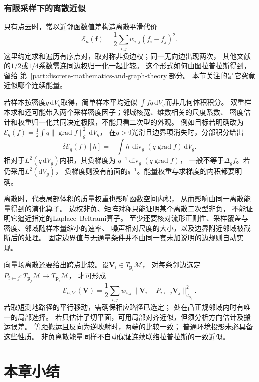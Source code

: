 \subsubsection{有限采样下的离散近似}
\label{sec:geometry-sampled-geometric-operators}

只有点云时，常以近邻函数值差构造离散平滑代价
\[
 \mathcal E_n(\bm f)=\frac12\sum_{i,j}w_{i,j}(f_i-f_j)^2.
\]
这里约定求和遍历有序点对，取对称非负边权；同一无向边出现两次，
其他文献的$1/2$或$1/4$系数需连同边权归一化一起比较。
这个形式如何由图拉普拉斯得到，留给
第~\ref{part:discrete-mathematics-and-graph-theory}部分。
本节关注的是它究竟近似哪个连续能量。

若样本按密度$q\,\mathrm dV_g$取得，简单样本平均近似
$\int f q\,\mathrm dV_g$而非几何体积积分。
双重样本求和还可能带入两个采样密度因子；邻域核宽、维数相关的尺度系数、
密度估计和权重归一化共同决定极限，不能只看二次型的外观。
例如目标若明确改为
$\mathcal E_q(f)=\frac12\int q\lVert\operatorname{grad}f\rVert_g^2\,\mathrm dV_g$，
在$q>0$光滑且边界项消失时，分部积分给出
\[
 \delta\mathcal E_q(f)[h]
 =-\int h\,\operatorname{div}_g(q\operatorname{grad}f)\,\mathrm dV_g.
\]
相对于$L^2(q\,\mathrm dV_g)$内积，其负梯度为
$q^{-1}\operatorname{div}_g(q\operatorname{grad}f)$，
一般不等于$\Delta_gf$。若仍采用$L^2(\mathrm dV_g)$，
负梯度则没有前面的$q^{-1}$。能量权重与求梯度的内积都要明确。

离散时，代表局部体积的质量权重也影响函数空间内积，
从而影响由同一离散能量得到的演化算子。
边权非负、矩阵对称只能证明某个离散二次型非负，
不能证明它逼近指定的Laplace--Beltrami算子。
至少还要核对流形正则性、采样覆盖与密度、邻域随样本量缩小的速率、
噪声相对尺度的大小，以及边界附近邻域被截断后的处理。
固定边界值与无通量条件并不由同一套未加说明的边规则自动实现。

向量场离散还要给出跨点比较。设$\bm V_i\in T_{\bm p_i}\mathcal M$，
对每条邻边选定$P_{i\leftarrow j}:T_{\bm p_j}\mathcal M\to T_{\bm p_i}\mathcal M$，
才可形成
\[
 \mathcal E_{n,\nabla}(\bm V)
 =\frac12\sum_{i,j}w_{i,j}
      \lVert\bm V_i-P_{i\leftarrow j}\bm V_j\rVert_{g_{\bm p_i}}^2.
\]
若取短测地路径的平行移动，需确保相应路径已选定；
处在凸正规邻域内时有唯一的局部选择。
若只估计了切平面，可用局部对齐近似，但须分析方向估计及搬运误差。
等距搬运且反向为逆映射时，两端的比较一致；
普通环境投影未必具备这些性质。
非负离散能量同样不自动保证连续联络拉普拉斯的一致近似。

\section{本章小结}
\label{sec:geometry-summary}

